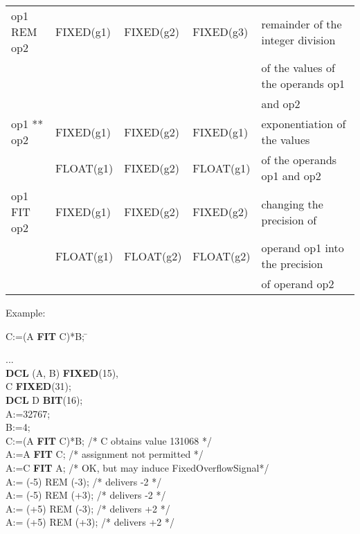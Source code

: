 \begin{table}
\begin{center}
\begin{tabular}{|l|l|l|l|l|}
op1 REM op2
\index{REM@\textbf{REM}|textbf}
      & FIXED(g1)       & FIXED(g2)       & FIXED(g3)         & remainder of the integer division\\
                 &                 &                 &                   & of the values of the operands op1\\
                 &                 &                 &                   & and op2\\ \hline

op1 ** op2       & FIXED(g1)       & FIXED(g2)       & FIXED(g1)         & exponentiation of the values\\
                 & FLOAT(g1)       & FIXED(g2)       & FLOAT(g1)         & of the operands op1 and op2\\ \hline

op1 FIT op2
\index{FIT@\textbf{FIT}|textbf}
      & FIXED(g1)       & FIXED(g2)       & FIXED(g2)         & changing the precision of\\
                 & FLOAT(g1)       & FLOAT(g2)       & FLOAT(g2)         & operand op1 into the precision\\
                 &                 &                 &                   & of operand op2\\  
\hline
\end{tabular}
\end{center}
\end{table}

Example:

\begin{tabbing}
C:=(A {\bf FIT} C)*B; \x \x \= \kill

... \> \\
{\bf DCL} (A, B) {\bf FIXED}(15), \> \\
\x        C {\bf FIXED}(31);      \> \\
{\bf DCL} D {\bf BIT}(16);        \> \\
A:=32767;                         \> \\
B:=4;                             \> \\
C:=(A {\bf FIT} C)*B;    \> /* C obtains value 131068 */ \\
A:=A {\bf FIT} C;        \> /* assignment not permitted */ \\
A:=C {\bf FIT} A;        \> /* OK, but may induce FixedOverflowSignal*/ \\
A:= (-5) REM (-3);	 \> /* delivers -2 */ \\
A:= (-5) REM (+3);	 \> /* delivers -2 */ \\
A:= (+5) REM (-3);	 \> /* delivers +2 */ \\
A:= (+5) REM (+3);	 \> /* delivers +2 */ \\
\end{tabbing}


